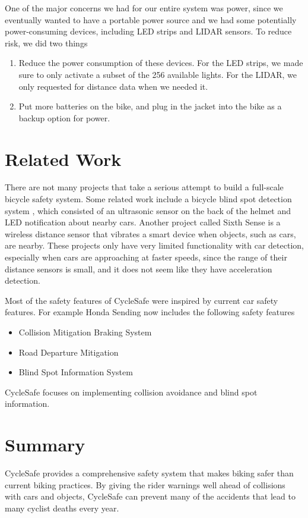 \documentclass[journal]{IEEEtran}
\begin{document}
One of the major concerns we had for our entire system was power, since we eventually wanted to have a portable power source and we had some potentially power-consuming devices, including LED strips and LIDAR sensors. To reduce risk, we did two things
\begin{enumerate}
    \item Reduce the power consumption of these devices. For the LED strips, we made sure to only activate a subset of the 256 available lights. For the LIDAR, we only requested for distance data when we needed it.
    \item Put more batteries on the bike, and plug in the jacket into the bike as a backup option for power.
\end{enumerate}

\section{Related Work}
There are not many projects that take a serious attempt to build a full-scale bicycle safety system. Some related work include a bicycle blind spot detection system \cite{bicycle_blind_spot}, which consisted of an ultrasonic sensor on the back of the helmet and LED notification about nearby cars. Another project called Sixth Sense \cite{bicycle_sixth_sense} is a wireless distance sensor that vibrates a smart device when objects, such as cars, are nearby. These projects only have very limited functionality with car detection, especially when cars are approaching at faster speeds, since the range of their distance sensors is small, and it does not seem like they have acceleration detection.

Most of the safety features of CycleSafe were inspired by current car safety features. For example Honda Sending \cite{honda_safety} now includes the following safety features
\begin{itemize}
    \item Collision Mitigation Braking System
    \item Road Departure Mitigation
    \item Blind Spot Information System
\end{itemize}
CycleSafe focuses on implementing collision avoidance and blind spot information.

\section{Summary}
CycleSafe provides a comprehensive safety system that makes biking safer than current biking practices. By giving the rider warnings well ahead of collisions with cars and objects, CycleSafe can prevent many of the accidents that lead to many cyclist deaths every year.
\end{document}
